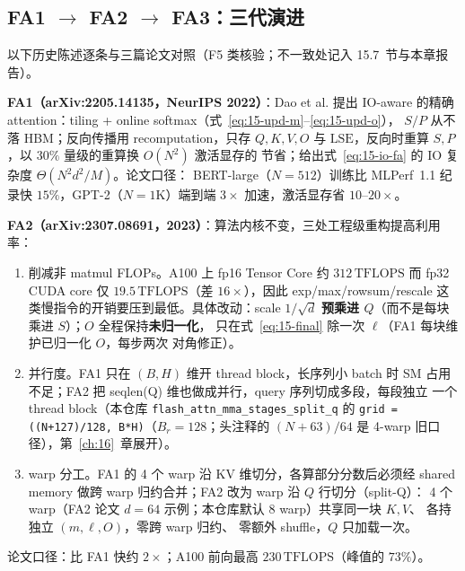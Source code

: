 \subsection{FA1 $\to$ FA2 $\to$ FA3：三代演进}

以下历史陈述逐条与三篇论文对照（F5 类核验；不一致处记入 15.7~节与本章报告）。

\textbf{FA1（arXiv:2205.14135，NeurIPS 2022）}：Dao et al. 提出 IO-aware 的精确
attention：tiling + online softmax（式~\ref{eq:15-upd-m}--\ref{eq:15-upd-o}），
$S/P$ 从不落 HBM；反向传播用 recomputation，只存 $Q,K,V,O$ 与
$\mathrm{LSE}$，反向时重算 $S, P$，以 $30\%$ 量级的重算换 $O(N^{2})$ 激活显存的
节省；给出式~\ref{eq:15-io-fa} 的 IO 复杂度 $\Theta(N^{2}d^{2}/M)$。论文口径：
BERT-large（$N{=}512$）训练比 MLPerf~1.1 纪录快 $15\%$，GPT-2（$N{=}1$K）端到端
$3\times$ 加速，激活显存省 $10$--$20\times$。

\textbf{FA2（arXiv:2307.08691，2023）}：算法内核不变，三处工程级重构提高利用率：
\begin{enumerate}[itemsep=0pt,topsep=2pt]
  \item 削减非 matmul FLOPs。A100 上 fp16 Tensor Core 约 $312\,\mathrm{TFLOPS}$
        而 fp32 CUDA core 仅 $19.5\,\mathrm{TFLOPS}$（差 $16\times$），因此
        exp/max/rowsum/rescale 这类慢指令的开销要压到最低。具体改动：scale $1/\sqrt{d}$
        \textbf{预乘进 $Q$}（而不是每块乘进 $S$）；$O$ 全程保持\textbf{未归一化}，
        只在式~\ref{eq:15-final} 除一次 $\ell$（FA1 每块维护已归一化 $O$，每步两次
        对角修正）。
  \item 并行度。FA1 只在 $(B, H)$ 维开 thread block，长序列小 batch 时 SM 占用
        不足；FA2 把 seqlen(Q) 维也做成并行，query 序列切成多段，每段独立
        一个 thread block（本仓库 \texttt{flash\_\allowbreak{}attn\_\allowbreak{}mma\_\allowbreak{}stages\_\allowbreak{}split\_\allowbreak{}q}
        的 \texttt{grid = ((N+127)/128, B*H)}（$B_r{=}128$；头注释的 $(N{+}63)/64$
        是 4-warp 旧口径），第~\ref{ch:16}~章展开）。
  \item warp 分工。FA1 的 4 个 warp 沿 KV 维切分，各算部分分数后必须经 shared
        memory 做跨 warp 归约合并；FA2 改为 warp 沿 $Q$ 行切分（split-Q）：
        4 个 warp（FA2 论文 $d{=}64$ 示例；本仓库默认 8 warp）共享同一块 $K, V$、
        各持独立 $(m, \ell, O)$，零跨 warp 归约、
        零额外 shuffle，$Q$ 只加载一次。
\end{enumerate}
论文口径：比 FA1 快约 $2\times$；A100 前向最高 $230\,\mathrm{TFLOPS}$（峰值的
$73\%$）。

